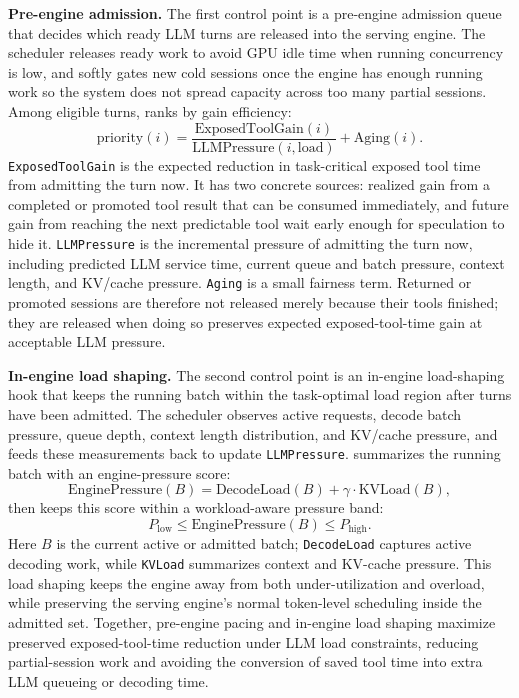 \noindent\textbf{Pre-engine admission.}
The first control point is a pre-engine admission queue that decides which ready LLM turns are released into the serving engine.
The scheduler releases ready work to avoid GPU idle time when running concurrency is low, and softly gates new cold sessions once the engine has enough running work so the system does not spread capacity across too many partial sessions.
Among eligible turns, \sys ranks by gain efficiency:
\[
\mathrm{priority}(i) =
    \frac{\mathrm{ExposedToolGain}(i)}
         {\mathrm{LLMPressure}(i,\mathrm{load})}
    + \mathrm{Aging}(i).
\]
\texttt{ExposedToolGain} is the expected reduction in task-critical exposed tool time from admitting the turn now.
It has two concrete sources: realized gain from a completed or promoted tool result that can be consumed immediately, and future gain from reaching the next predictable tool wait early enough for speculation to hide it.
\texttt{LLMPressure} is the incremental pressure of admitting the turn now, including predicted LLM service time, current queue and batch pressure, context length, and KV/cache pressure.
\texttt{Aging} is a small fairness term.
Returned or promoted sessions are therefore not released merely because their tools finished; they are released when doing so preserves expected exposed-tool-time gain at acceptable LLM pressure.

\noindent\textbf{In-engine load shaping.}
The second control point is an in-engine load-shaping hook that keeps the running batch within the task-optimal load region after turns have been admitted.
The scheduler observes active requests, decode batch pressure, queue depth, context length distribution, and KV/cache pressure, and feeds these measurements back to update \texttt{LLMPressure}.
\sys summarizes the running batch with an engine-pressure score:
\[
\mathrm{EnginePressure}(B) =
    \mathrm{DecodeLoad}(B) + \gamma \cdot \mathrm{KVLoad}(B),
\]
\sys then keeps this score within a workload-aware pressure band:
\[
P_{\mathrm{low}} \le \mathrm{EnginePressure}(B) \le P_{\mathrm{high}}.
\]
Here $B$ is the current active or admitted batch; \texttt{DecodeLoad} captures active decoding work, while \texttt{KVLoad} summarizes context and KV-cache pressure.
This load shaping keeps the engine away from both under-utilization and overload, while preserving the serving engine's normal token-level scheduling inside the admitted set.
Together, pre-engine pacing and in-engine load shaping maximize preserved exposed-tool-time reduction under LLM load constraints, reducing partial-session work and avoiding the conversion of saved tool time into extra LLM queueing or decoding time.
